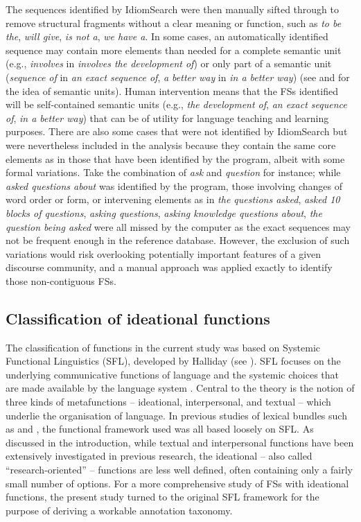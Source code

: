 \documentclass[output=paper]{langscibook}
\begin{document}
The sequences identified by IdiomSearch were then manually sifted through to remove structural fragments without a clear meaning or function, such as \textit{to be the}, \textit{will give}, \textit{is not a}, \textit{we have a}. In some cases, an automatically identified sequence may contain more elements than needed for a complete semantic unit (e.g., \textit{involves} in \textit{involves the development of}) or only part of a semantic unit (\textit{sequence of} in \textit{an exact sequence of}, \textit{a better way} in \textit{in a better way}) (see \citealt{MartinezSchmitt2012} and \citealt{Buerki2016} for the idea of semantic units). Human intervention means that the FSs identified will be self-contained semantic units (e.g., \textit{the development of}, \textit{an exact sequence of}, \textit{in a better way}) that can be of utility for language teaching and learning purposes. There are also some cases that were not identified by IdiomSearch but were nevertheless included in the analysis because they contain the same core elements as in those that have been identified by the program, albeit with some formal variations. Take the combination of \textit{ask} and \textit{question} for instance; while \textit{asked questions about} was identified by the program, those involving changes of word order or form, or intervening elements as in \textit{the questions asked}, \textit{asked 10 blocks of questions}, \textit{asking questions}, \textit{asking knowledge questions about}, \textit{the question being asked} were all missed by the computer as the exact sequences may not be frequent enough in the reference database. However, the exclusion of such variations would risk overlooking potentially important features of a given discourse community, and a manual approach was applied exactly to identify those non-contiguous FSs.

\subsection{Classification of ideational functions}\label{sec:wang:2.3}

The classification of functions in the current study was based on Systemic Functional Linguistics (SFL), developed by Halliday (see \citealt{Halliday2014matthiessen}). SFL focuses on the underlying communicative functions of language and the systemic choices that are made available by the language system \citep{Gledhill2011}. Central to the theory is the notion of three kinds of metafunctions – ideational, interpersonal, and textual – which underlie the organisation of language. In previous studies of lexical bundles such as \citet{Hyland2008Lexical} and \citet{BiberEtAl2004}, the functional framework used was all based loosely on SFL. As discussed in the introduction, while textual and interpersonal functions have been extensively investigated in previous research, the ideational – also called  ``research-oriented'' – functions are less well defined, often containing only a fairly small number of options. For a more comprehensive study of FSs with ideational functions, the present study turned to the original SFL framework for the purpose of deriving a workable annotation taxonomy.
\end{document}

